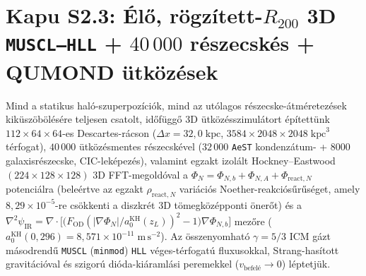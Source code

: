 \documentclass[11pt,a4paper]{article}
\begin{document}
\section{\texorpdfstring{Kapu S2.3: Élő, rögzített-$R_{200}$ 3D \texttt{MUSCL--HLL} + $40\,000$ részecskés + QUMOND ütközések}{Kapu S2.3: Elo, rogzitett-R200 3D MUSCL-HLL + 40 000 reszecskes + QUMOND utkozesek}}
\label{sec:step2-bullet-hu}
Mind a statikus haló-szuperpozíciók, mind az utólagos részecske-átméretezések kiküszöbölésére teljesen csatolt, időfüggő 3D ütközésszimulátort építettünk $112\times 64\times 64$-es Descartes-rácson ($\Delta x = 32{,}0\;\mathrm{kpc}$, $3584\times 2048\times 2048\;\mathrm{kpc}^3$ térfogat), $40\,000$ ütközésmentes részecskével ($32\,000$ \texttt{AeST} kondenzátum- + $8000$ galaxisrészecske, CIC-leképezés), valamint egzakt izolált Hockney--Eastwood $(224\times 128\times 128)$ 3D FFT-megoldóval a $\Phi_N = \Phi_{N,b} + \Phi_{N,A} + \Phi_{\mathrm{react},N}$ potenciálra (beleértve az egzakt $\rho_{\mathrm{react},N}$ variációs Noether-reakciósűrűséget, amely $8{,}29\times 10^{-5}$-re csökkenti a diszkrét 3D tömegközépponti önerőt) és a $\nabla^2\psi_{\mathrm{IR}} = \nabla\cdot\bigl[\bigl(F_{\mathrm{OD}}(|\nabla\Phi_N|/a_0^{\mathrm{KH}}(z_L))^2 - 1\bigr)\nabla\Phi_{N,b}\bigr]$ mezőre ($a_0^{\mathrm{KH}}(0{,}296) = 8{,}571\times 10^{-11}\;\mathrm{m\,s^{-2}}$). Az összenyomható $\gamma = 5/3$ ICM gázt másodrendű \texttt{MUSCL} (\texttt{minmod}) \texttt{HLL} véges-térfogatú fluxusokkal, Strang-hasított gravitációval és szigorú dióda-kiáramlási peremekkel ($v_{\text{befelé}} \to 0$) léptetjük.
\end{document}
